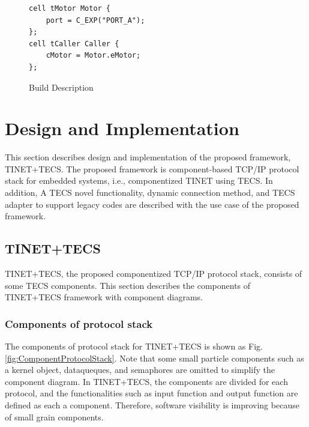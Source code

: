 \documentclass[conference]{IEEEtran/IEEEtran}
\begin{document}
\begin{description}
\begin{figure}[t]
\centering
\begin{lstlisting}
cell tMotor Motor {
    port = C_EXP("PORT_A");
};
cell tCaller Caller {
    cMotor = Motor.eMotor;
};
\end{lstlisting}
\caption{Build Description}
\label{build}
\end{figure}

\end{description}

\section{Design and Implementation}
\label{sec:Design and Implementation}

This section describes design and implementation of the proposed framework, TINET+TECS.
The proposed framework is component-based TCP/IP protocol stack for embedded systems, i.e., componentized TINET using TECS.
In addition, A TECS novel functionality, dynamic connection method, and TECS adapter to support legacy codes are described with the use case of the proposed framework.

\subsection{TINET+TECS}
TINET+TECS, the proposed componentized TCP/IP protocol stack, consists of some TECS components.
This section describes the components of TINET+TECS framework with component diagrams.

\subsubsection{Components of protocol stack}

The components of protocol stack for TINET+TECS is shown as Fig. \ref{fig:ComponentProtocolStack}.
Note that some small particle components such as a kernel object, dataqueques, and semaphores are omitted to simplify the component diagram.
In TINET+TECS, the components are divided for each protocol, and the functionalities such as input function and output function are defined as each a component.
Therefore, software visibility is improving because of small grain components.
\end{document}
